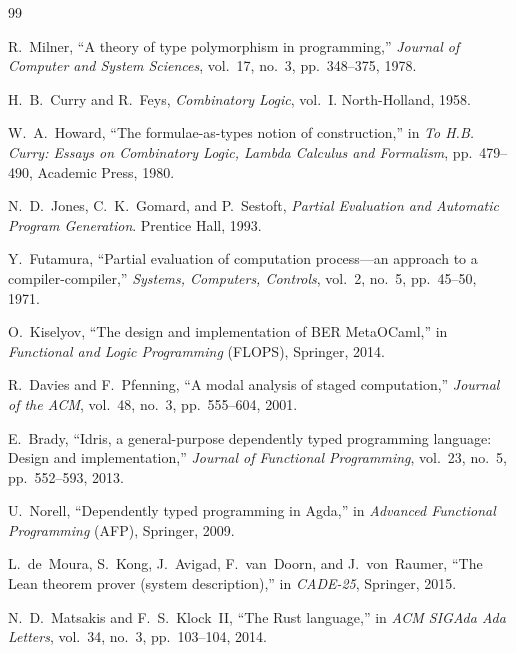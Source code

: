 \documentclass[11pt]{article}
\begin{document}
\begin{thebibliography}{99}

R.~Milner, ``A theory of type polymorphism in programming,''
\textit{Journal of Computer and System Sciences}, vol.~17, no.~3, pp.~348--375, 1978.

H.~B.~Curry and R.~Feys, \textit{Combinatory Logic}, vol.~I.
North-Holland, 1958.

W.~A.~Howard, ``The formulae-as-types notion of construction,'' in
\textit{To H.B. Curry: Essays on Combinatory Logic, Lambda Calculus and
Formalism}, pp.~479--490, Academic Press, 1980.

N.~D.~Jones, C.~K.~Gomard, and P.~Sestoft, \textit{Partial Evaluation and
Automatic Program Generation}. Prentice Hall, 1993.

Y.~Futamura, ``Partial evaluation of computation process---an approach to a
compiler-compiler,'' \textit{Systems, Computers, Controls}, vol.~2, no.~5,
pp.~45--50, 1971.

O.~Kiselyov, ``The design and implementation of BER MetaOCaml,'' in
\textit{Functional and Logic Programming} (FLOPS), Springer, 2014.

R.~Davies and F.~Pfenning, ``A modal analysis of staged computation,''
\textit{Journal of the ACM}, vol.~48, no.~3, pp.~555--604, 2001.

E.~Brady, ``Idris, a general-purpose dependently typed programming language:
Design and implementation,'' \textit{Journal of Functional Programming},
vol.~23, no.~5, pp.~552--593, 2013.

U.~Norell, ``Dependently typed programming in Agda,'' in \textit{Advanced
Functional Programming} (AFP), Springer, 2009.

L.~de~Moura, S.~Kong, J.~Avigad, F.~van~Doorn, and J.~von~Raumer, ``The
Lean theorem prover (system description),'' in \textit{CADE-25}, Springer, 2015.

N.~D.~Matsakis and F.~S.~Klock~II, ``The Rust language,'' in \textit{ACM
SIGAda Ada Letters}, vol.~34, no.~3, pp.~103--104, 2014.


\end{thebibliography}
\end{document}
